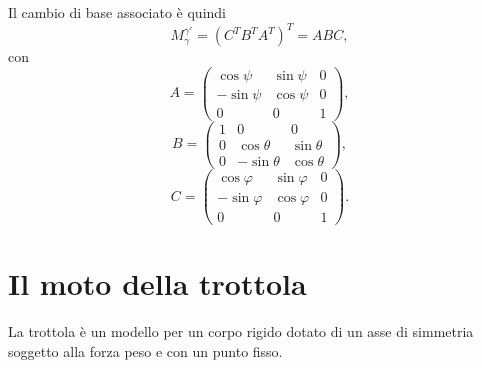 Il cambio di base associato è quindi
\[
M_{\gamma}^{\gamma'}
=
(C^TB^TA^T)^T
=
ABC,
\]
con
\[
A=
\begin{pmatrix}
\cos\psi & \sin\psi & 0\\
-\sin\psi & \cos\psi & 0\\
0 & 0 & 1
\end{pmatrix},
\]
\[
B=
\begin{pmatrix}
1 & 0 & 0\\
0 & \cos\theta & \sin\theta\\
0 & -\sin\theta & \cos\theta
\end{pmatrix},
\]
\[
C=
\begin{pmatrix}
\cos\varphi & \sin\varphi & 0\\
-\sin\varphi & \cos\varphi & 0\\
0 & 0 & 1
\end{pmatrix}.
\]
\vspace{30pt}
\section{Il moto della trottola}

La trottola è un modello per un corpo rigido dotato di un asse di simmetria soggetto alla forza peso e con un punto fisso.

